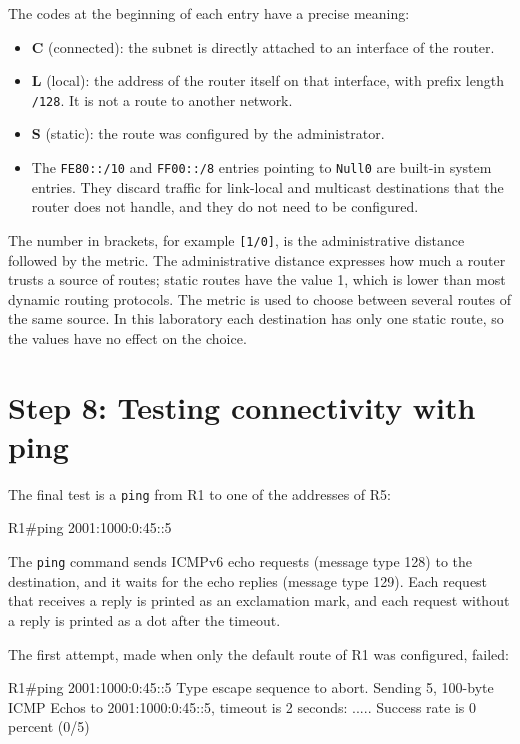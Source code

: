 The codes at the beginning of each entry have a precise meaning:

\begin{itemize}
\item \textbf{C} (connected): the subnet is directly attached to an interface of the router.
\item \textbf{L} (local): the address of the router itself on that interface, with prefix length \texttt{/128}. It is not a route to another network.
\item \textbf{S} (static): the route was configured by the administrator.
\item The \texttt{FE80::/10} and \texttt{FF00::/8} entries pointing to \texttt{Null0} are built-in system entries. They discard traffic for link-local and multicast destinations that the router does not handle, and they do not need to be configured.
\end{itemize}

The number in brackets, for example \texttt{[1/0]}, is the administrative distance followed by the metric. The administrative distance expresses how much a router trusts a source of routes; static routes have the value 1, which is lower than most dynamic routing protocols. The metric is used to choose between several routes of the same source. In this laboratory each destination has only one static route, so the values have no effect on the choice.

\section{Step 8: Testing connectivity with ping}

The final test is a \texttt{ping} from R1 to one of the addresses of R5:

\begin{codeblock}
R1#ping 2001:1000:0:45::5
\end{codeblock}

The \texttt{ping} command sends ICMPv6 echo requests (message type 128) to the destination, and it waits for the echo replies (message type 129). Each request that receives a reply is printed as an exclamation mark, and each request without a reply is printed as a dot after the timeout.

The first attempt, made when only the default route of R1 was configured, failed:

\begin{codeblock}
R1#ping 2001:1000:0:45::5
Type escape sequence to abort.
Sending 5, 100-byte ICMP Echos to 2001:1000:0:45::5, timeout is 2 seconds:
.....
Success rate is 0 percent (0/5)
\end{codeblock}

